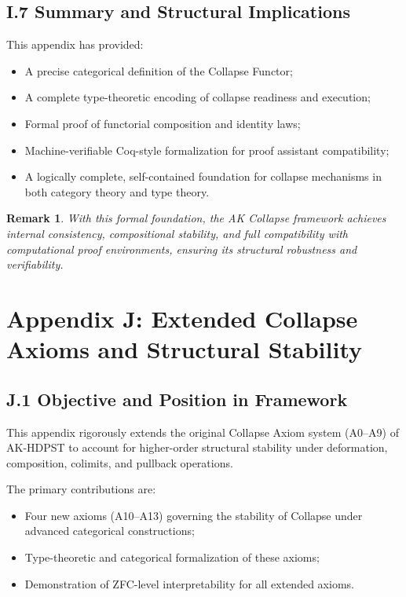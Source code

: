 \documentclass[11pt]{article}
\newtheorem{remark}[theorem]{Remark}
\begin{document}
\subsection*{I.7 Summary and Structural Implications}

This appendix has provided:

\begin{itemize}
    \item A precise categorical definition of the Collapse Functor;
    \item A complete type-theoretic encoding of collapse readiness and execution;
    \item Formal proof of functorial composition and identity laws;
    \item Machine-verifiable Coq-style formalization for proof assistant compatibility;
    \item A logically complete, self-contained foundation for collapse mechanisms in both category theory and type theory.
\end{itemize}

\begin{remark}
With this formal foundation, the AK Collapse framework achieves internal consistency, compositional stability, and full compatibility with computational proof environments, ensuring its structural robustness and verifiability.
\end{remark}



\section*{Appendix J: Extended Collapse Axioms and Structural Stability}

\subsection*{J.1 Objective and Position in Framework}

This appendix rigorously extends the original Collapse Axiom system (A0–A9) of AK-HDPST to account for higher-order structural stability under deformation, composition, colimits, and pullback operations.

The primary contributions are:

\begin{itemize}
    \item Four new axioms (A10–A13) governing the stability of Collapse under advanced categorical constructions;
    \item Type-theoretic and categorical formalization of these axioms;
    \item Demonstration of ZFC-level interpretability for all extended axioms.
\end{itemize}
\end{document}
